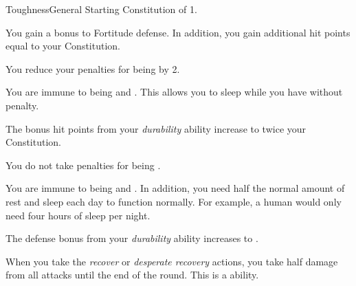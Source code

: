     \begin{feat}{Toughness}{General}
        \featpre Starting Constitution of 1.

         You gain a  bonus to Fortitude defense.
        In addition, you gain additional hit points equal to your Constitution.

         You reduce your penalties for being  by 2.

         You are immune to being  and .
        This allows you to sleep while you have  without penalty.

         The bonus hit points from your \textit{durability} ability increase to twice your Constitution.

         You do not take penalties for being .

         You are immune to being  and .
        In addition, you need half the normal amount of rest and sleep each day to function normally.
        For example, a human would only need four hours of sleep per night.

         The defense bonus from your \textit{durability} ability increases to .

         When you take the \textit{recover} or \textit{desperate recovery} actions, you take half damage from all attacks until the end of the round.
        This is a  ability.
    \end{feat}

